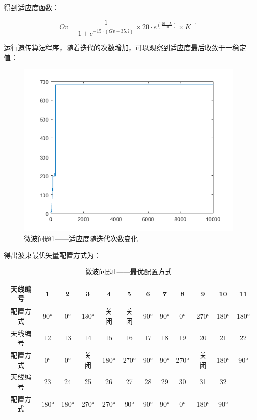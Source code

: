 \documentclass[UTF8,12pt]{ctexart}
\begin{document}
得到适应度函数：
\begin{Large}
    $$Ov = {\frac{1}{1+e^{-15·(Gv-35.5)}}}
        ×20·e^{(\frac{20-Iv}{10})}×{K}^{-1}$$
\end{Large}

运行遗传算法程序，随着迭代的次数增加，可以观察到适应度最后收敛于一稳定值：
\begin{figure}[H]
    \centering
    \includegraphics[scale=0.82]{lian1.png}
    \caption{微波问题1——适应度随迭代次数变化}
\end{figure}
得出波束最优矢量配置方式为：
\begin{table}[htbp]
    \centering
    \caption{微波问题1——最优配置方式}
    \begin{tabular}{cccccccccccc}
        \toprule
        天线编号 & 1    & 2    & 3    & 4    & 5    & 6   & 7   & 8    & 9    & 10   & 11   \\
        \midrule
        配置方式 & 90°  & 0°   & 180° & 关闭 & 关闭 & 90° & 90° & 0°   & 270° & 180° & 180° \\
        \midrule
        天线编号 & 12   & 13   & 14   & 15   & 16   & 17  & 18  & 19   & 20   & 21   & 22   \\
        \midrule
        配置方式 & 0°   & 0°   & 关闭 & 180° & 270° & 90° & 90° & 270° & 关闭 & 180° & 90°  \\
        \midrule
        天线编号 & 23   & 24   & 25   & 26   & 27   & 28  & 29  & 30   & 31   & 32   &      \\
        \midrule
        配置方式 & 180° & 180° & 270° & 270° & 90°  & 90° & 90° & 0°   & 180° & 90°  &      \\
        \bottomrule
    \end{tabular}%
    \label{tab:addlabel}%
\end{table}%
\end{document}
